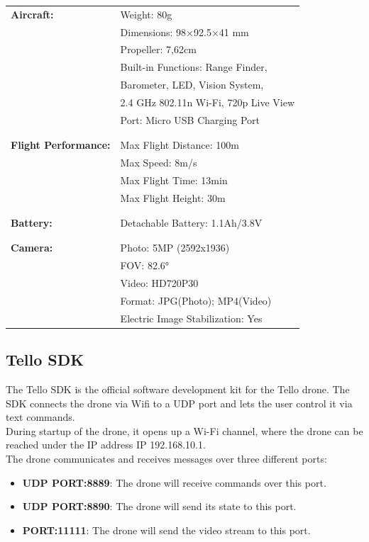 \documentclass[a4paper,11pt,singlespacing]{article}
\begin{document}
\begin{center}
	\begin{tabular}{ l  l} 
	\hline
	 \textbf{Aircraft:} & Weight: 80g\\
	 & Dimensions: 98×92.5×41 mm  \\
	 & Propeller: 7,62cm\\
	 & Built-in Functions: Range Finder,\\
	 & Barometer, LED, Vision System,\\
	 & 2.4 GHz 802.11n Wi-Fi, 720p Live View\\
	 & Port: Micro USB Charging Port\\\\
	 \hline
	\\
	 \textbf{Flight Performance:} & Max Flight Distance: 100m\\
	 & Max Speed: 8m/s\\
	 & Max Flight Time: 13min\\
	 & Max Flight Height: 30m\\\\
	 \hline
	 \\
	 \textbf{Battery:} & Detachable Battery: 1.1Ah/3.8V\\\\
	 \hline
	 \\
	 \textbf{Camera:} & Photo: 5MP (2592x1936)\\
	 & FOV: 82.6° \\
	 & Video: HD720P30\\
	 & Format: JPG(Photo); MP4(Video)\\
	 & Electric Image Stabilization: Yes\\
	 \hline
	\end{tabular}
\end{center}



\subsection{Tello SDK}

The Tello SDK\cite{TelloSDK} is the official software development kit for the Tello drone. 
The SDK connects the drone via Wifi to a UDP port and lets the user control it via
text commands.
\\
During startup of the drone, it opens up a Wi-Fi channel, where the drone can be 
reached under the IP address IP 192.168.10.1.\\

The drone communicates and receives messages over three different ports:\\
\begin{itemize}
	\item \textbf{UDP PORT:8889}: The drone will receive commands over this port.
	\item \textbf{UDP PORT:8890}: The drone will send its state to this port.
	\item \textbf{PORT:11111}: The drone will send the video stream to this port.
\end{itemize}
\end{document}
